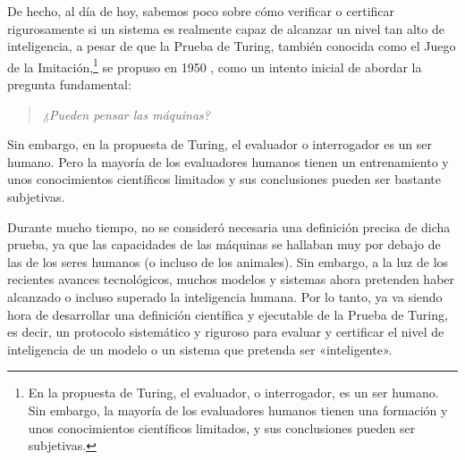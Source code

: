 \documentclass[../../book-main_es.tex]{subfiles}
\begin{document}
De hecho, al día de hoy, sabemos poco sobre cómo verificar
o certificar rigurosamente si un sistema es realmente capaz de alcanzar un nivel tan alto
de inteligencia, a pesar de que la Prueba de Turing, también conocida como el
Juego de la Imitación,\footnote{En la propuesta de Turing, el evaluador, o
    interrogador, es un ser humano. Sin embargo, la mayoría de los evaluadores humanos tienen una
    formación y unos conocimientos científicos limitados, y sus conclusiones pueden ser
subjetivas.} se propuso en 1950 \citep{Turing-1950}, como un 
intento inicial de abordar la pregunta fundamental:
\begin{quote}
    \centering
    \textit{¿Pueden pensar las máquinas?}
\end{quote}
Sin embargo, en la propuesta de Turing, el evaluador o interrogador es  
un ser humano. Pero la mayoría de los evaluadores humanos tienen un entrenamiento y unos conocimientos científicos limitados
y sus conclusiones pueden ser bastante subjetivas.

Durante mucho tiempo, no se consideró necesaria una definición precisa de dicha prueba, ya 
que las capacidades de las máquinas se hallaban muy por debajo de las de los seres humanos (o 
incluso de los animales). Sin embargo, a la luz de los recientes avances tecnológicos, muchos 
modelos y sistemas ahora pretenden haber alcanzado o incluso superado la inteligencia humana. Por lo 
tanto, ya va siendo hora de desarrollar una definición científica y ejecutable de la Prueba de Turing, 
es decir, un protocolo sistemático y riguroso para evaluar y certificar el nivel de inteligencia 
de un modelo o un sistema que pretenda ser «inteligente».
\end{document}
